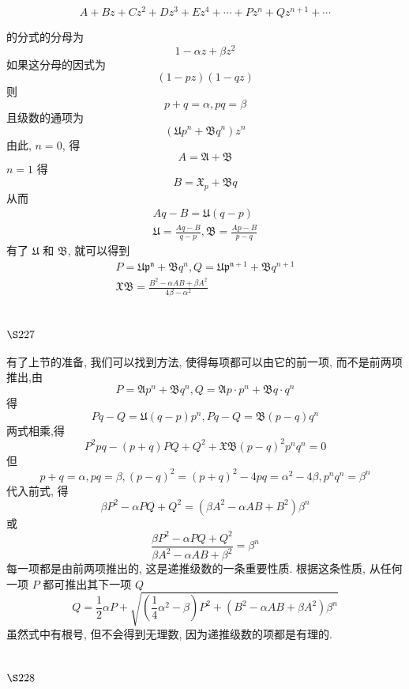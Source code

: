 \[
A+B z+C z^2+D z^3+E z^4+\cdots+P z^n+Q z^{n+1}+\cdots
\]

的分式的分母为
\[
1-\alpha z+\beta z^{2}
\]
如果这分母的因式为
\[
(1-p z)(1-q z)
\]
则
\[
p+q=\alpha, p q=\beta
\]
且级数的通项为
\[
\left(\mathfrak{U} p^{n}+\mathfrak{B} q^{n}\right) z^{n}
\]
由此, $n=0$, 得
\[
A=\mathfrak{A}+\mathfrak{B}
\]
$n=1$ 得
\[
B=\mathfrak{X}_{p}+\mathfrak{B} q
\]
从而
\[
\begin{gathered}
A q-B=\mathfrak{U}(q-p) \\
\mathfrak{U}=\frac{A q-B}{q-p}, \mathfrak{B}=\frac{A p-B}{p-q}
\end{gathered}
\]
有了 $\mathfrak{U}$ 和 $\mathfrak{B}$, 就可以得到
\[
\begin{gathered}
P=\mathfrak{U} \mathfrak{p}^{\mathfrak{n}}+\mathfrak{B} q^{n}, Q=\mathfrak{U} \mathfrak{p}^{\mathfrak{n}+1}+\mathfrak{B} q^{n+1} \\
\mathfrak{X} \mathfrak{B}=\frac{B^{2}-\alpha A B+\beta A^{2}}{4 \beta-\alpha^{2}} 
\end{gathered}
\]
\section{$\S 227$}

有了上节的准备, 我们可以找到方法, 使得每项都可以由它的前一项, 而不是前两项 推出,由
\[
P=\mathfrak{A} p^{n}+\mathfrak{B} q^{n}, Q=\mathfrak{A} p \cdot p^{n}+\mathfrak{B} q \cdot q^{n}
\]
得
\[
P q-Q=\mathfrak{U}(q-p) p^{n}, P q-Q=\mathfrak{B}(p-q) q^{n}
\]
两式相乘,得
\[
P^{2} p q-(p+q) P Q+Q^{2}+\mathfrak{X B}(p-q)^{2} p^{n} q^{n}=0
\]
但
\[
p+q=\alpha, p q=\beta,(p-q)^{2}=(p+q)^{2}-4 p q=\alpha^{2}-4 \beta, p^{n} q^{n}=\beta^{n}
\]
代入前式, 得
\[
\beta P^{2}-\alpha P Q+Q^{2}=\left(\beta A^{2}-\alpha A B+B^{2}\right) \beta^{n}
\]
或
\[
\frac{\beta P^{2}-\alpha P Q+Q^{2}}{\beta A^{2}-\alpha A B+\beta^{2}}=\beta^{n}
\]
每一项都是由前两项推出的, 这是递推级数的一条重要性质. 根据这条性质, 从任何一项 $P$ 都可推出其下一项 $Q$
\[
Q=\frac{1}{2} \alpha P+\sqrt{\left(\frac{1}{4} \alpha^{2}-\beta\right) P^{2}+\left(B^{2}-\alpha A B+\beta A^{2}\right) \beta^{n}}
\]
虽然式中有根号, 但不会得到无理数, 因为递推级数的项都是有理的.

\section{$\S 228$}

